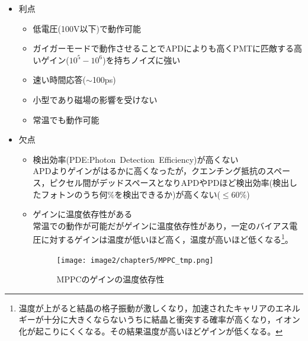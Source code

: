 \begin{itemize}
\item 利点

\begin{itemize}
\item 低電圧(100V以下)で動作可能
\item ガイガーモードで動作させることでAPDによりも高くPMTに匹敵する高いゲイン($10^5-10^6$)を持ちノイズに強い
\item 速い時間応答($\sim$100ps)
\item 小型であり磁場の影響を受けない
\item 常温でも動作可能
\end{itemize}

\item 欠点
\begin{itemize}
\item 検出効率(PDE:Photon\ Detection\ Efficiency)が高くない\\ APDよりゲインがはるかに高くなったが，クエンチング抵抗のスペース，ピクセル間がデッドスペースとなりAPDやPDほど検出効率(検出したフォトンのうち何$\%$を検出できるか)が高くない($\leq60\%$)
\item ゲインに温度依存性がある\\常温での動作が可能だがゲインに温度依存性があり，一定のバイアス電圧に対するゲインは温度が低いほど高く，温度が高いほど低くなる\footnote{温度が上がると結晶の格子振動が激しくなり，加速されたキャリアのエネルギーが十分に大きくならないうちに結晶と衝突する確率が高くなり，イオン化が起こりにくくなる。その結果温度が高いほどゲインが低くなる。}。

\begin{figure}[H]
 \begin{center}
  \texttt{[image: image2/chapter5/MPPC\_tmp.png]} 
 \end{center}
 \caption{MPPCのゲインの温度依存性}
 \label{fig:MPPC_tmp}
\end{figure}



\end{itemize}
\end{itemize}
